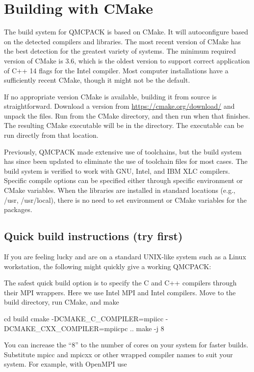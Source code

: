 \section{Building with CMake}
\label{sec:cmake}
The build system for QMCPACK is based on CMake.  It will autoconfigure
based on the detected compilers and libraries. The most recent
version of CMake has the best detection for the greatest variety of
systems.  The minimum required version of CMake is 3.6, which is the
oldest version to support correct application of C++ 14 flags for the Intel compiler.
Most computer installations have a sufficiently recent CMake, though it might not be
the default.

If no appropriate version CMake is available, building it from source is straightforward.
Download a version from \url{https://cmake.org/download/} and unpack the files.
Run  from the CMake directory, and then run 
when that finishes.  The resulting CMake executable will be in the  directory.
The executable can be run directly from that location.

Previously, QMCPACK made extensive use of toolchains, but the build system
has since been updated to eliminate the use of toolchain files for
most cases.  The build system is verified to work with GNU, Intel, and IBM XLC
compilers.  Specific compile options can be specified either through
specific environment or CMake variables.  When the libraries are
installed in standard locations (e.g., /usr, /usr/local), there is no
need to set environment or CMake variables for the packages.

\subsection{Quick build instructions (try first)}
\label{sec:cmakequick}

If you are feeling lucky and are on a standard UNIX-like system such
as a Linux workstation, the following might quickly give a
working QMCPACK:

The safest quick build option is to specify the C and C++ compilers
through their MPI wrappers. Here we use Intel MPI and Intel
compilers. Move to the build directory, run CMake, and make

\begin{shade}
cd build
cmake -DCMAKE_C_COMPILER=mpiicc -DCMAKE_CXX_COMPILER=mpiicpc ..
make -j 8
\end{shade}
You can increase the ``8'' to the number of cores on your system for
faster builds. Substitute mpicc and mpicxx or other wrapped compiler names to suit
  your system. For example, with OpenMPI use

